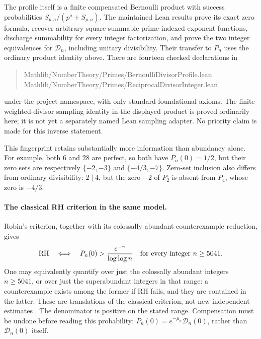 \documentclass[11pt]{article}
\theoremstyle{definition}
\begin{document}
The profile itself is a finite compensated Bernoulli product with
success probabilities $S_{p,a}/(p^a+S_{p,a})$.
The maintained Lean results prove its exact zero formula, recover
arbitrary square-summable prime-indexed exponent functions, discharge
summability for every integer factorization, and prove the two integer
equivalences for $\mathcal D_n$, including unitary divisibility.
Their transfer to $P_n$ uses the ordinary product identity above.
There are fourteen checked declarations in
\begin{quote}\small\ttfamily
Mathlib/NumberTheory/Primes/BernoulliDivisorProfile.lean\\
Mathlib/NumberTheory/Primes/ReciprocalDivisorInteger.lean
\end{quote}
under the project namespace, with only standard foundational axioms.
The finite weighted-divisor sampling identity in the displayed product
is proved ordinarily here; it is not yet a separately named Lean
sampling adapter. No priority claim is made for this inverse statement.

This fingerprint retains substantially more information than
abundancy alone. For example, both $6$ and $28$ are perfect, so both
have $P_n(0)=1/2$, but their zero sets are respectively
$\{-2,-3\}$ and $\{-4/3,-7\}$.
Zero-set inclusion also differs from ordinary divisibility:
$2\mid4$, but the zero $-2$ of $P_2$ is absent from $P_4$,
whose zero is $-4/3$.

\paragraph{The classical RH criterion in the same model.}
Robin's criterion, together with its colossally abundant
counterexample reduction, gives
\[
 \mathrm{RH}\quad\Longleftrightarrow\quad
 P_n(0)>\frac{e^{-\gamma}}{\log\log n}
 \quad\hbox{for every integer }n\ge5041.
\]
One may equivalently quantify over just the colossally abundant
integers $n\ge5041$, or over just the superabundant integers in that
range: a counterexample exists among the former if RH fails, and
they are contained in the latter. These are translations of the
classical criterion, not new independent estimates
\cite[Section~2 and equation~(1.2)]{Lagarias}.
The denominator is positive on the stated range. Compensation
must be undone before reading this probability:
$P_n(0)=e^{-\mu_n}\mathcal D_n(0)$, rather than
$\mathcal D_n(0)$ itself.
\end{document}
